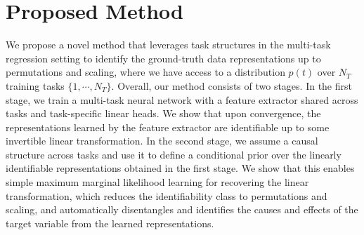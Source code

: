 \documentclass[nohyperref]{article}
\theoremstyle{plain}
\theoremstyle{definition}
\theoremstyle{remark}
\begin{document}
\section{Proposed Method}\label{sec:proposed_method}

We propose a novel method that leverages task structures in the multi-task regression setting to identify the ground-truth data representations up to permutations and scaling, where we have access to a distribution $p(t)$ over $N_T$ training tasks $\{1,\cdots,N_T\}$.
Overall, our method consists of two stages. In the first stage, we train a multi-task neural network with a feature extractor shared across tasks and task-specific linear heads. We show that upon convergence, the representations learned by the feature extractor are identifiable up to some invertible linear transformation. In the second stage, we assume a causal structure across tasks and use it to define a conditional prior over the linearly identifiable representations obtained in the first stage. We show that this enables simple maximum marginal likelihood learning for recovering the linear transformation, which reduces the identifiability class to permutations and scaling, and automatically disentangles and identifies the causes and effects of the target variable from the learned representations. 
\end{document}
